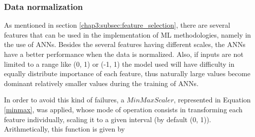


\subsubsection{Data normalization}\label{chap3:subsubsec:data_standardization}

As mentioned in section \ref{chap3:subsec:feature_selection}, there are several features that can be used in the implementation of \ac{ML} methodologies, namely in the use of \ac{ANNs}. Besides the several features having different scales, the \ac{ANNs} have a better performance when the data is normalized. Also, if inputs are not limited to a range like (0, 1) or (-1, 1) the model used will have difficulty in equally distribute importance of each feature, thus naturally large values become dominant relatively smaller values during the training of \ac{ANNs}.

In order to avoid this kind of failures, a $MinMaxScaler$, represented in Equation \ref{minmax}, was applied, whose mode of operation consists in transforming each feature individually, scaling it to a given interval (by default (0, 1)). Arithmetically, this function is given by

